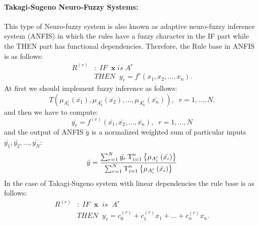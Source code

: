 \paragraph{Takagi-Sugeno Neuro-Fuzzy Systems:}
This type of Neuro-fuzzy system is also known as adaptive neuro-fuzzy inference system (ANFIS) in which the rules have a fuzzy character in the IF part while the THEN part has functional dependencies. Therefore, the Rule base in ANFIS is as follows:
\begin{equation} 
\begin{split}
R^{\left(r\right)} & :\;IF \;\; \mathbf{x}\;is\;A^{r} \\
 & THEN\;\;y_{r}=f^{r}\left(x_{1},x_{2},...,x_{n}\right).
\end{split}
\end{equation}
At first we should implement fuzzy inference as follows:
\begin{equation}
    T\left(\mu_{A_{1}^{r}}\left(\bar{x_{1}}\right),\mu_{A_{2}^{r}}\left(\bar{x_{2}}\right),...,\mu_{A_{n}^{r}}\left(\bar{x_{n}}\right)\right),\;\;r=1,...,N.
\end{equation}
and then we have to compute:
\begin{equation}
    \bar{y_{r}}=f^{\left(r\right)}\left(\bar{x_{1}},\bar{x_{2}},...,\bar{x_{n}}\right),\;\;r=1,...,N
\end{equation}
and the output of ANFIS $\bar{y}$ is a normalized weighted sum of particular inputs $\bar{y_{1}},\bar{y_{2}},...,\bar{y_{N}}$:
\begin{equation}
    \bar{y}= \frac{\sum_{r=1}^{N}\bar{y_{r}}\operatornamewithlimits{T}_{i=1}^{n}\left \{ \mu_{A_{i}^{r}}\left ( \bar{x_{i}} \right ) \right \}}{\sum_{r=1}^{N}\operatornamewithlimits{T}_{i=1}^{n}\left \{ \mu_{A_{i}^{r}}\left ( \bar{x_{i}} \right ) \right \}}
\end{equation}
In the case of Takagi-Sugeno system with linear dependencies the rule base is as follows:
\begin{equation}
    \begin{split}
R^{\left(r\right)} & :\;IF \;\; \mathbf{x}\;\;is\;\;A^{r} \\
 & THEN\;\;y_{r}=c_{0}^{\left(r\right)}+c_{1}^{\left(r\right)}x_{1}+...+c_{n}^{\left(r\right)}x_{n}.
\end{split}
\end{equation}
